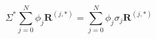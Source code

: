     \begin{equation}
        \Sigma^*\sum_{j=0}^N \phi_j\mathbf{R}^{(j,\ast)} = \sum_{j=0}^N \phi_j\sigma_j\mathbf{R}^{(j, \ast)}
    \label{eq:emt_solving_a}
    \end{equation}
